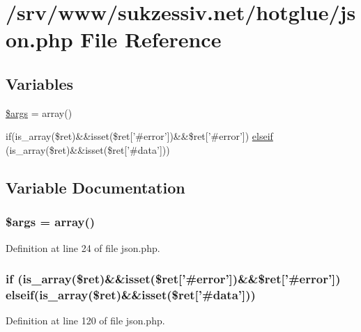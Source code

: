\hypertarget{json_8php}{
\section{/srv/www/sukzessiv.net/hotglue/json.php File Reference}
\label{json_8php}
}
\subsection*{Variables}
\begin{DoxyCompactItemize}
\item 
\hyperlink{json_8php_a67e94494731d99ed23b123e95175bc10}{\$args} = array()
\item 
if(is\_\-array(\$ret)\&\&isset(\$ret\mbox{[}'\#error'\mbox{]})\&\&\$ret\mbox{[}'\#error'\mbox{]}) \hyperlink{json_8php_affd32ec1771cd364116738727d3a1ed8}{elseif} (is\_\-array(\$ret)\&\&isset(\$ret\mbox{[}'\#data'\mbox{]}))
\end{DoxyCompactItemize}


\subsection{Variable Documentation}
\hypertarget{json_8php_a67e94494731d99ed23b123e95175bc10}{
\subsubsection[{\$args}]{\setlength{\rightskip}{0pt plus 5cm}\$args = array()}}
\label{json_8php_a67e94494731d99ed23b123e95175bc10}


Definition at line 24 of file json.php.

\hypertarget{json_8php_affd32ec1771cd364116738727d3a1ed8}{
\subsubsection[{elseif}]{\setlength{\rightskip}{0pt plus 5cm}if (is\_\-array(\$ret)\&\&isset(\$ret\mbox{[}'\#error'\mbox{]})\&\&\$ret\mbox{[}'\#error'\mbox{]}) {\bf elseif}(is\_\-array(\$ret)\&\&isset(\$ret\mbox{[}'\#data'\mbox{]}))}}
\label{json_8php_affd32ec1771cd364116738727d3a1ed8}


Definition at line 120 of file json.php.

